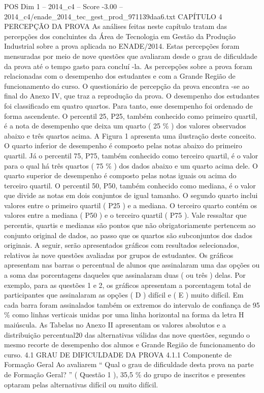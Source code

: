 \begin{textsample}{POS Dim 1 – 2014\_c4 – Score -3.00 – 2014\_c4/enade\_2014\_tec\_gest\_prod\_971139daa6.txt}  \label{ex:f1_pos_311}
CAPÍTULO 4 PERCEPÇÃO DA PROVA As análises feitas neste capítulo tratam das percepções dos concluintes da Área de Tecnologia em Gestão da Produção Industrial sobre a prova aplicada no ENADE/2014.
Estas percepções foram mensuradas por meio de nove questões que avaliaram desde o grau de dificuldade da prova até o tempo gasto para concluí -la.
As percepções sobre a prova foram relacionadas com o desempenho dos estudantes e com a Grande Região de funcionamento do curso.
O questionário de percepção da prova encontra -se ao final do Anexo IV, que traz a reprodução da prova.
O desempenho dos estudantes foi classificado em quatro quartos.
Para tanto, esse desempenho foi ordenado de forma ascendente.
O percentil 25, P25, também conhecido como primeiro quartil, é a nota de desempenho que deixa um quarto ( 25 \% ) dos valores observados abaixo e três quartos acima.
A Figura 1 apresenta uma ilustração deste conceito.
O quarto inferior de desempenho é composto pelas notas abaixo do primeiro quartil.
Já o percentil 75, P75, também conhecido como terceiro quartil, é o valor para o qual há três quartos ( 75 \% ) dos dados abaixo e um quarto acima dele.
O quarto superior de desempenho é composto pelas notas iguais ou acima do terceiro quartil.
O percentil 50, P50, também conhecido como mediana, é o valor que divide as notas em dois conjuntos de igual tamanho.
O segundo quarto inclui valores entre o primeiro quartil ( P25 ) e a mediana.
O terceiro quarto contém os valores entre a mediana ( P50 ) e o terceiro quartil ( P75 ).
Vale ressaltar que percentis, quartis e medianas são pontos que não obrigatoriamente pertencem ao conjunto original de dados, ao passo que os quartos são subconjuntos dos dados originais.
A seguir, serão apresentados gráficos com resultados selecionados, relativos às nove questões avaliadas por grupos de estudantes.
Os gráficos apresentam nas barras o percentual de alunos que assinalaram uma das opções ou a soma das porcentagens daqueles que assinalaram duas ( ou três ) delas.
Por exemplo, para as questões 1 e 2, os gráficos apresentam a porcentagem total de participantes que assinalaram as opções ( D ) difícil e ( E ) muito difícil.
Em cada barra foram assinalados também os extremos do intervalo de confiança de 95 \% como linhas verticais unidas por uma linha horizontal na forma da letra H maiúscula.
As Tabelas no Anexo II apresentam os valores absolutos e a distribuição percentual20 das alternativas válidas das nove questões, segundo o mesmo recorte de desempenho dos alunos e Grande Região de funcionamento do curso. 4.1 GRAU DE DIFICULDADE DA PROVA 4.1.1 Componente de Formação Geral Ao avaliarem “ Qual o grau de dificuldade desta prova na parte de Formação Geral? ” ( Questão 1 ), 35,5 \% do grupo de inscritos e presentes optaram pelas alternativas difícil ou muito difícil.

\end{textsample}
